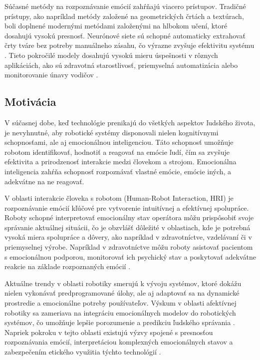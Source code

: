 Súčasné metódy na rozpoznávanie emócií zahŕňajú viacero prístupov. Tradičné prístupy, ako napríklad metódy založené na geometrických črtách a textúrach, boli doplnené modernými metódami založenými 
na hlbokom učení, ktoré dosahujú vysokú presnosť. Neurónové siete sú schopné automaticky extrahovať črty tváre bez potreby manuálneho zásahu, čo výrazne zvyšuje efektivitu systému​. Tieto pokročilé 
modely dosahujú vysokú mieru úspešnosti v rôznych aplikáciách, ako sú zdravotná starostlivosť, priemyselná automatizácia alebo monitorovanie únavy vodičov​ \cite{article03} \cite{book01}.

\subsection{Motivácia}
V súčasnej dobe, keď technológie prenikajú do všetkých aspektov ľudského života, je nevyhnutné, aby robotické systémy disponovali nielen kognitívnymi schopnosťami, ale aj emocionálnou inteligenciou. 
Táto schopnosť umožňuje robotom identifikovať, hodnotiť a reagovať na emócie ľudí, čím sa zvyšuje efektivita a prirodzenosť interakcie medzi človekom a strojom. Emocionálna inteligencia zahŕňa schopnosť 
rozpoznávať vlastné emócie, emócie iných, a adekvátne na ne reagovať.​

V oblasti interakcie človeka s robotom (Human-Robot Interaction, HRI) je rozpoznávanie emócií kľúčové pre vytvorenie intuitívnej a efektívnej spolupráce. Roboty schopné interpretovať emocionálny stav operátora 
môžu prispôsobiť svoje správanie aktuálnej situácii, čo je obzvlášť dôležité v oblastiach, kde je potrebná vysoká miera spolupráce a dôvery, ako napríklad v zdravotníctve, vzdelávaní či v priemyselnej výrobe. 
Napríklad v zdravotníctve môžu roboty asistovať pacientom s emocionálnou podporou, monitorovať ich psychický stav a poskytovať adekvátne reakcie na základe rozpoznaných emócií \cite{article01}.​

Aktuálne trendy v oblasti robotiky smerujú k vývoju systémov, ktoré dokážu nielen vykonávať predprogramované úlohy, ale aj adaptovať sa na dynamické prostredie a emocionálne potreby používateľov. 
Výskum v oblasti afektívnej robotiky sa zameriava na integráciu emocionálnych modelov do robotických systémov, čo umožňuje lepšie porozumenie a predikciu ľudského správania . Napriek pokroku v tejto oblasti existujú 
výzvy spojené s presnosťou rozpoznávania emócií, interpretáciou komplexných emocionálnych stavov a zabezpečením etického využitia týchto technológií \cite{article01}.​

